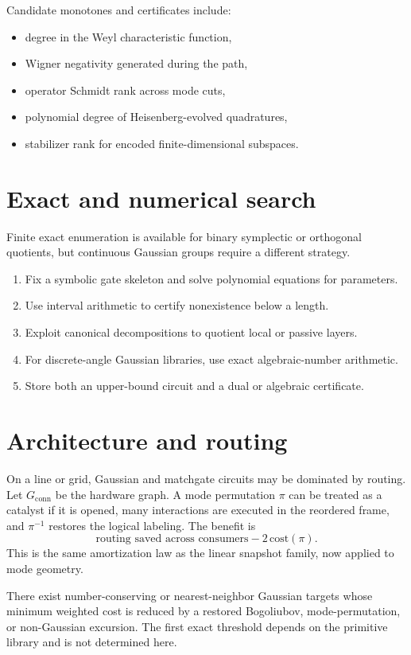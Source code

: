 Candidate monotones and certificates include:
\begin{itemize}
\item degree in the Weyl characteristic function,
\item Wigner negativity generated during the path,
\item operator Schmidt rank across mode cuts,
\item polynomial degree of Heisenberg-evolved quadratures,
\item stabilizer rank for encoded finite-dimensional subspaces.
\end{itemize}

\section{Exact and numerical search}
Finite exact enumeration is available for binary symplectic or orthogonal quotients, but continuous Gaussian groups require a different strategy.
\begin{enumerate}
\item Fix a symbolic gate skeleton and solve polynomial equations for parameters.
\item Use interval arithmetic to certify nonexistence below a length.
\item Exploit canonical decompositions to quotient local or passive layers.
\item For discrete-angle Gaussian libraries, use exact algebraic-number arithmetic.
\item Store both an upper-bound circuit and a dual or algebraic certificate.
\end{enumerate}

\section{Architecture and routing}
On a line or grid, Gaussian and matchgate circuits may be dominated by routing.  Let $G_{\mathrm{conn}}$ be the hardware graph.  A mode permutation $\pi$ can be treated as a catalyst if it is opened, many interactions are executed in the reordered frame, and $\pi^{-1}$ restores the logical labeling.  The benefit is
\[
\text{routing saved across consumers}
-
2\,\text{cost}(\pi).
\]
This is the same amortization law as the linear snapshot family, now applied to mode geometry.

\begin{conjecturebox}
There exist number-conserving or nearest-neighbor Gaussian targets whose minimum weighted cost is reduced by a restored Bogoliubov, mode-permutation, or non-Gaussian excursion.  The first exact threshold depends on the primitive library and is not determined here.
\end{conjecturebox}

